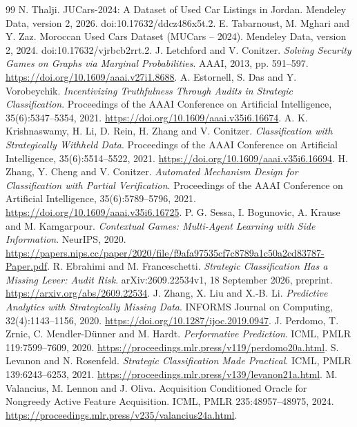 \documentclass[11pt]{article}
\begin{document}
\begin{thebibliography}{99}
 N. Thalji.
JUCars-2024: A Dataset of Used Car Listings in Jordan.
Mendeley Data, version 2, 2026. doi:10.17632/ddcz486x5t.2.
 E. Tabarnoust, M. Mghari and Y. Zaz.
Moroccan Used Cars Dataset (MUCars -- 2024).
Mendeley Data, version 2, 2024. doi:10.17632/vjrbcb2rrt.2.
 J. Letchford and V. Conitzer.
\emph{Solving Security Games on Graphs via Marginal Probabilities}.
AAAI, 2013, pp. 591--597. \url{https://doi.org/10.1609/aaai.v27i1.8688}.
 A. Estornell, S. Das and Y. Vorobeychik.
\emph{Incentivizing Truthfulness Through Audits in Strategic Classification}.
Proceedings of the AAAI Conference on Artificial Intelligence,
35(6):5347--5354, 2021. \url{https://doi.org/10.1609/aaai.v35i6.16674}.
 A. K. Krishnaswamy, H. Li, D. Rein, H. Zhang and V. Conitzer.
\emph{Classification with Strategically Withheld Data}.
Proceedings of the AAAI Conference on Artificial Intelligence,
35(6):5514--5522, 2021. \url{https://doi.org/10.1609/aaai.v35i6.16694}.
 H. Zhang, Y. Cheng and V. Conitzer.
\emph{Automated Mechanism Design for Classification with Partial Verification}.
Proceedings of the AAAI Conference on Artificial Intelligence,
35(6):5789--5796, 2021.
\url{https://doi.org/10.1609/aaai.v35i6.16725}.
 P. G. Sessa, I. Bogunovic, A. Krause and M. Kamgarpour.
\emph{Contextual Games: Multi-Agent Learning with Side Information}.
NeurIPS, 2020.
\url{https://papers.nips.cc/paper/2020/file/f9afa97535cf7c8789a1c50a2cd83787-Paper.pdf}.
 R. Ebrahimi and M. Franceschetti.
\emph{Strategic Classification Has a Missing Lever: Audit Risk}.
arXiv:2609.22534v1, 18 September 2026, preprint.
\url{https://arxiv.org/abs/2609.22534}.
 J. Zhang, X. Liu and X.-B. Li.
\emph{Predictive Analytics with Strategically Missing Data}.
INFORMS Journal on Computing, 32(4):1143--1156, 2020.
\url{https://doi.org/10.1287/ijoc.2019.0947}.
 J. Perdomo, T. Zrnic, C. Mendler-D\"unner and M. Hardt.
\emph{Performative Prediction}. ICML, PMLR 119:7599--7609, 2020.
\url{https://proceedings.mlr.press/v119/perdomo20a.html}.
 S. Levanon and N. Rosenfeld.
\emph{Strategic Classification Made Practical}. ICML, PMLR 139:6243--6253, 2021.
\url{https://proceedings.mlr.press/v139/levanon21a.html}.
 M. Valancius, M. Lennon and J. Oliva.
Acquisition Conditioned Oracle for Nongreedy Active Feature Acquisition.
ICML, PMLR 235:48957--48975, 2024.
\url{https://proceedings.mlr.press/v235/valancius24a.html}.

\end{thebibliography}
\end{document}
